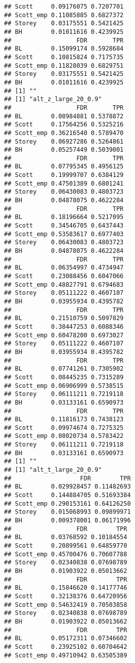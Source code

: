 \documentclass{article}\usepackage[]{graphicx}\usepackage[]{color}
\makeatletter
\newenvironment{kframe}{%
 \def\at@end@of@kframe{}%
 \ifinner\ifhmode%
  \def\at@end@of@kframe{\end{minipage}}%
  \begin{minipage}{\columnwidth}%
 \fi\fi%
 \def\FrameCommand##1{\hskip\@totalleftmargin \hskip-\fboxsep
 \colorbox{shadecolor}{##1}\hskip-\fboxsep
     \hskip-\linewidth \hskip-\@totalleftmargin \hskip\columnwidth}%
 \MakeFramed {\advance\hsize-\width
   \@totalleftmargin\z@ \linewidth\hsize
   \@setminipage}}%
 {\par\unskip\endMakeFramed%
 \at@end@of@kframe}
\newenvironment{knitrout}{}{} %
\makeatother
\begin{document}
\begin{knitrout}
\begin{kframe}
\begin{verbatim}
## Scott     0.09176075 0.7207701
## Scott_emp 0.11085885 0.6827372
## Storey    0.03175551 0.5421425
## BH        0.01011616 0.4239925
##                  FDR       TPR
## BL        0.15099174 0.5928684
## Scott     0.10815824 0.7175735
## Scott_emp 0.11828039 0.6829751
## Storey    0.03175551 0.5421425
## BH        0.01011616 0.4239925
## [1] ""
## [1] "alt_z_large_20_0.9"
##                  FDR       TPR
## BL        0.08984881 0.5378872
## Scott     0.17564256 0.5325216
## Scott_emp 0.36216540 0.5789470
## Storey    0.06927286 0.5264861
## BH        0.05257449 0.5039001
##                  FDR       TPR
## BL        0.07795345 0.4956125
## Scott     0.19999707 0.6384129
## Scott_emp 0.47501389 0.6801241
## Storey    0.06430083 0.4803723
## BH        0.04878075 0.4622284
##                  FDR       TPR
## BL        0.18196664 0.5217095
## Scott     0.34546705 0.6437443
## Scott_emp 0.53583617 0.6977403
## Storey    0.06430083 0.4803723
## BH        0.04878075 0.4622284
##                  FDR       TPR
## BL        0.06354997 0.4734947
## Scott     0.23088456 0.6047066
## Scott_emp 0.48827791 0.6794683
## Storey    0.05111222 0.4607107
## BH        0.03955934 0.4395782
##                  FDR       TPR
## BL        0.21510759 0.5097829
## Scott     0.38447253 0.6088346
## Scott_emp 0.60478200 0.6973027
## Storey    0.05111222 0.4607107
## BH        0.03955934 0.4395782
##                  FDR       TPR
## BL        0.07741261 0.7305902
## Scott     0.08445235 0.7315289
## Scott_emp 0.06906999 0.5738515
## Storey    0.06111211 0.7219118
## BH        0.03133161 0.6590973
##                  FDR       TPR
## BL        0.11816173 0.7438123
## Scott     0.09974674 0.7275325
## Scott_emp 0.08020734 0.5783422
## Storey    0.06111211 0.7219118
## BH        0.03133161 0.6590973
## [1] ""
## [1] "alt_t_large_20_0.9"
##                   FDR        TPR
## BL        0.029928457 0.11482693
## Scott     0.144884705 0.51693384
## Scott_emp 0.290153161 0.64126250
## Storey    0.015068993 0.09899971
## BH        0.009378001 0.06171996
##                  FDR        TPR
## BL        0.03768592 0.10184554
## Scott     0.20899561 0.64859770
## Scott_emp 0.45700476 0.70607788
## Storey    0.02340838 0.07698789
## BH        0.01903922 0.05013662
##                  FDR        TPR
## BL        0.15846620 0.14177746
## Scott     0.32138376 0.64720956
## Scott_emp 0.54632419 0.70503858
## Storey    0.02340838 0.07698789
## BH        0.01903922 0.05013662
##                  FDR        TPR
## BL        0.05172311 0.07346602
## Scott     0.23925102 0.60704642
## Scott_emp 0.49710942 0.63505389

\end{verbatim}
\end{kframe}
\end{knitrout}
\end{document}
